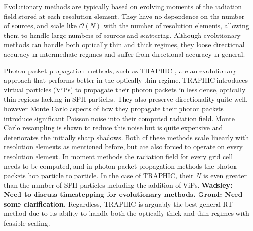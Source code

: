 \documentclass[fleq,usenatbib]{mnras}
\newcommand{\comment}[1]{\textbf{\color{red}#1}}
\begin{document}
Evolutionary methods are typically based on evolving moments of the radiation 
field stored at each resolution element. They have no dependence on the number 
of sources, and scale like $\mathcal{O}(N)$ with the number of resolution 
elements, allowing them to handle large numbers of sources and scattering. 
Although evolutionary methods can handle both optically thin and thick 
regimes, they loose directional accuracy in intermediate regimes and suffer 
from directional accuracy in general.

Photon packet propagation methods, such as TRAPHIC \citep{pawlikSchaye08}, are 
an evolutionary approach that performs better in the optically thin regime. 
TRAPHIC introduces virtual particles (ViPs) to propagate their photon packets 
in less dense, optically thin regions lacking in SPH particles. 
They also preserve directionality quite well, however Monte Carlo aspects of 
how they propagate their photon packets introduce significant Poisson noise 
into their computed radiation field. Monte Carlo resampling is shown to reduce 
this noise but is quite expensive and deteriorates the initially sharp 
shadows. Both of these methods scale linearly with resolution elements as 
mentioned before, but are also forced to operate on every resolution element. 
In moment methods the radiation field for every grid cell needs to be 
computed, and in photon packet propagation methods the photon packets hop 
particle to particle. In the case of TRAPHIC, their $N$ is even greater than 
the number of SPH particles including the addition of ViPs. \comment{Wadsley: 
Need to discuss timestepping for evolutionary methods. Grond: Need some 
clarification.} Regardless, TRAPHIC is arguably the best general RT method due 
to its ability to handle both the optically thick and thin regimes with 
feasible scaling.
\end{document}
